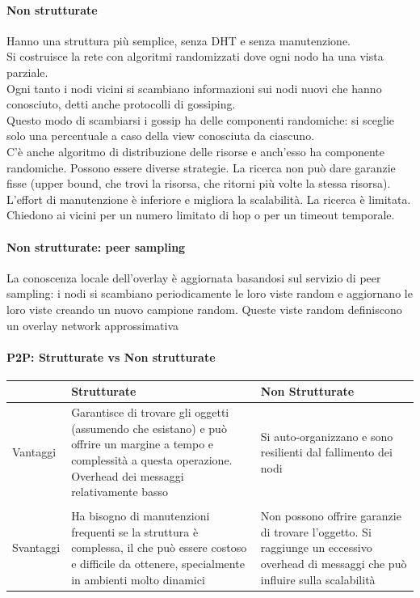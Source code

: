 \paragraph{Non strutturate}
Hanno una struttura più semplice, senza DHT e senza manutenzione. \\
Si costruisce la rete con algoritmi randomizzati dove ogni nodo ha una vista parziale. \\
Ogni tanto i nodi vicini si scambiano informazioni sui nodi nuovi che hanno conosciuto, detti anche protocolli di gossiping. \\
Questo modo di scambiarsi i gossip ha delle componenti randomiche: si sceglie solo una percentuale a caso della view conosciuta da ciascuno. \\
C'è anche algoritmo di distribuzione delle risorse e anch'esso ha componente randomiche.  Possono essere diverse strategie. La ricerca non può dare garanzie fisse (upper bound, che trovi la risorsa, che ritorni più volte la stessa risorsa). L'effort di manutenzione è inferiore e migliora la scalabilità. La ricerca è limitata. Chiedono ai vicini per un numero limitato di hop o per un timeout temporale. 

\paragraph{Non strutturate: peer sampling}
La conoscenza locale dell'overlay è aggiornata basandosi sul servizio di peer sampling: i nodi si scambiano periodicamente le loro viste random e aggiornano le loro viste creando un nuovo campione random. Queste viste random definiscono un overlay network approssimativa

\paragraph{P2P: Strutturate vs Non strutturate}

\begin{table}[!ht]
    \centering
    \begin{tabular}{p{}|p{}|p{}}
        \hline
         & Strutturate & Non Strutturate \\
        \hline
        Vantaggi & Garantisce di trovare gli oggetti (assumendo che esistano) e può offrire un margine a tempo e complessità a questa operazione. Overhead dei messaggi relativamente basso & Si auto-organizzano e sono resilienti dal fallimento dei nodi \\ 
        & &  \\
        Svantaggi & Ha bisogno di manutenzioni frequenti se la struttura è complessa, il che può essere costoso e difficile da ottenere, specialmente in ambienti molto dinamici & Non possono offrire garanzie di trovare l'oggetto. Si raggiunge un eccessivo overhead di messaggi che può influire sulla scalabilità \\ 
        \hline
    \end{tabular}
\end{table}

